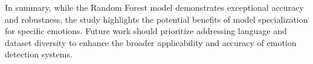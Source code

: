 In summary, while the Random Forest model demonstrates exceptional accuracy and robustness, the study highlights the potential benefits of model specialization for specific emotions. Future work should prioritize addressing language and dataset diversity to enhance the broader applicability and accuracy of emotion detection systems.